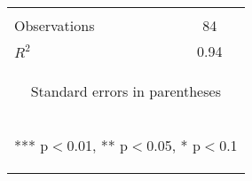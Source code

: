 \begin{center}
\begin{tabular}{lc}
\vspace{4pt} & \begin{footnotesize}\end{footnotesize} \\
Observations & 84 \\
 $R^2$ & 0.94 \\ \hline
\multicolumn{2}{c}{\begin{footnotesize} Standard errors in parentheses\end{footnotesize}} \\
\multicolumn{2}{c}{\begin{footnotesize} *** p$<$0.01, ** p$<$0.05, * p$<$0.1\end{footnotesize}} \\
\end{tabular}
\end{center}

